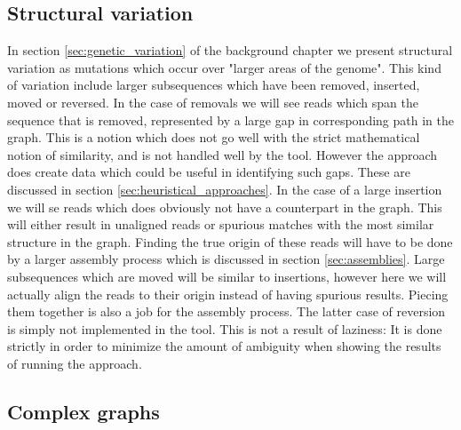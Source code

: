 \documentclass[thesis.tex]{subfiles}
\begin{document}
\subsection*{Structural variation}
In section \ref{sec:genetic_variation} of the background chapter we present structural variation as mutations which occur over "larger areas of the genome". This kind of variation include larger subsequences which have been removed, inserted, moved or reversed. In the case of removals we will see reads which span the sequence that is removed, represented by a large gap in corresponding path in the graph. This is a notion which does not go well with the strict mathematical notion of similarity, and is not handled well by the tool. However the approach does create data which could be useful in identifying such gaps. These are discussed in section \ref{sec:heuristical_approaches}. In the case of a large insertion we will se reads which does obviously not have a counterpart in the graph. This will either result in unaligned reads or spurious matches with the most similar structure in the graph. Finding the true origin of these reads will have to be done by a larger assembly process which is discussed in section \ref{sec:assemblies}. Large subsequences which are moved will be similar to insertions, however here we will actually align the reads to their origin instead of having spurious results. Piecing them together is also a job for the assembly process. The latter case of reversion is simply not implemented in the tool. This is not a result of laziness: It is done strictly in order to minimize the amount of ambiguity when showing the results of running the approach.
\subsection*{Complex graphs}
\end{document}
